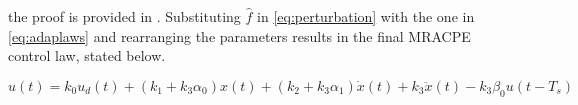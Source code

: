 the proof is provided in \cite{Qingson:2016}. Substituting $\hat{f}$ in \eqref{eq:perturbation} with the one in \eqref{eq:adaplaws} and rearranging the parameters results in the final MRACPE control law, stated below.

\begin{equation}
    \label{eq:adaplawsfinal}
  u(t) = k_0u_d(t) + (k_1 + k_3\alpha_0)x(t) +  (k_2 + k_3\alpha_1)\dot{x}(t) + k_3\ddot{x}(t) - k_3\beta_0u(t-T_s)
\end{equation}




